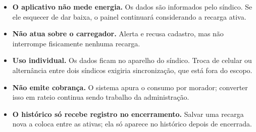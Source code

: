 \documentclass[12pt,a4paper]{article}
\begin{document}
\begin{itemize}[itemsep=3pt]
\item \textbf{O aplicativo não mede energia.} Os dados são informados pelo síndico. Se ele
      esquecer de dar baixa, o painel continuará considerando a recarga ativa.
\item \textbf{Não atua sobre o carregador.} Alerta e recusa cadastro, mas não interrompe
      fisicamente nenhuma recarga.
\item \textbf{Uso individual.} Os dados ficam no aparelho do síndico. Troca de celular ou
      alternância entre dois síndicos exigiria sincronização, que está fora do escopo.
\item \textbf{Não emite cobrança.} O sistema apura o consumo por morador; converter isso em
      rateio continua sendo trabalho da administração.
\item \textbf{O histórico só recebe registro no encerramento.} Salvar uma recarga nova a
      coloca entre as ativas; ela só aparece no histórico depois de encerrada.
\end{itemize}
\end{document}
